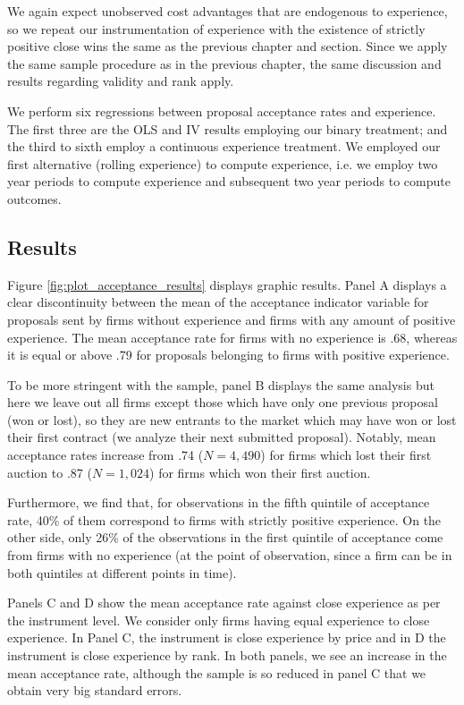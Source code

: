 We again expect  unobserved cost advantages that are endogenous to experience, so we repeat our instrumentation of experience with the existence of strictly positive close wins the same as the previous chapter and section. Since we apply the same sample procedure as in the previous chapter, the same discussion and results regarding validity and rank apply.

We perform six regressions between proposal acceptance rates and experience. The first three are the OLS and IV results employing our binary treatment; and the third to sixth employ a continuous experience treatment. We employed our first alternative (rolling experience) to compute experience, i.e. we employ two year periods to compute experience and subsequent two year periods to compute outcomes.

\subsection{Results}
Figure \ref{fig:plot_acceptance_results} displays graphic results. Panel A displays a clear discontinuity between the mean of the acceptance indicator variable for proposals sent by firms without experience and firms with any amount of positive experience. The mean acceptance rate for firms with no experience is .68, whereas it is equal or above .79 for proposals belonging to firms with positive experience.

To be more stringent with the sample, panel B displays the same analysis but here we leave out all firms except those which have only one previous proposal (won or lost), so they are new entrants to the market which may have won or lost their first contract (we analyze their next submitted proposal).  Notably, mean acceptance rates increase from .74 ($N=4,490$) for firms which lost their first auction to .87 ($N=1,024$) for firms which won their first auction.

Furthermore, we find that, for observations in the fifth quintile of acceptance rate, 40\% of them correspond to firms with strictly positive experience. On the other side, only 26\% of the observations in the first quintile of acceptance come from firms with no experience (at the point of observation, since a firm can be in both quintiles at different points in time).

Panels C and D show the mean acceptance rate against close experience as per the instrument level. We consider only firms having equal experience to close experience. In Panel C, the instrument is close experience by price and in D the instrument is close experience by rank. In both panels, we see an increase in the mean acceptance rate, although the sample is so reduced in panel C that we obtain very big standard errors.


